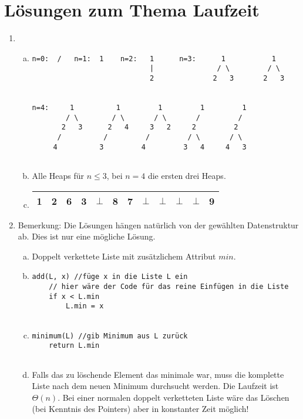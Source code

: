 \documentclass{scrartcl}
\begin{document}
\section*{Lösungen zum Thema Laufzeit}
\begin{enumerate}[(1)]

\item \begin{enumerate}[(a)]
\item
\begin{verbatim}
n=0:  /   n=1:  1    n=2:   1      n=3:      1           1
                            |               / \         / \
                            2              2   3       2   3
                            

n=4:     1          1         1         1         1
        / \        / \       / \       /         /  
       2   3      2   4     3   2     2         2
      /          /         /         / \       / \
     4          3         4         3   4     4   3
     
\end{verbatim}
\item Alle Heaps f\"ur $n\leq 3$, bei $n=4$ die ersten drei Heaps.
\item \begin{tabular}{|c|c|c|c|c|c|c|c|c|c|c|c|}
\hline
1 & 2 & 6 & 3 & $\bot$ & 8 & 7 & $\bot$ & $\bot$ & $\bot$ & $\bot$ & 9 \\ \hline
\end{tabular}
\end{enumerate}

\item 
Bemerkung: Die L\"osungen h\"angen nat\"urlich von der gew\"ahlten Datenstruktur ab. Dies ist nur eine m\"ogliche L\"osung.
\begin{enumerate}[(a)]
\item Doppelt verkettete Liste mit zus\"atzlichem Attribut $min$.
\item
\begin{verbatim}
add(L, x) //füge x in die Liste L ein
    // hier wäre der Code für das reine Einfügen in die Liste
    if x < L.min
    	L.min = x
    	
\end{verbatim}
\item
\begin{verbatim}
minimum(L) //gib Minimum aus L zurück
    return L.min
    	
\end{verbatim}
\item Falls das zu l\"oschende Element das minimale war, muss die komplette Liste nach dem neuen Minimum durchsucht werden. Die Laufzeit ist $\Theta(n)$. Bei einer normalen doppelt verketteten Liste w\"are das L\"oschen (bei Kenntnis des Pointers) aber in konstanter Zeit m\"oglich!
\end{enumerate}

\end{enumerate}
\end{document}
